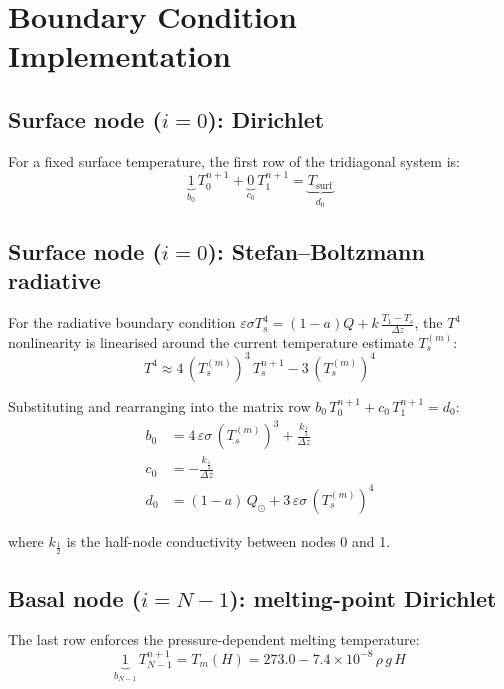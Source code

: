 \documentclass[11pt,a4paper]{article}
\newcommand{\half}{\tfrac{1}{2}}
\begin{document}
\section{Boundary Condition Implementation}
\label{sec:bc_impl}

\subsection{Surface node ($i = 0$): Dirichlet}

For a fixed surface temperature, the first row of the tridiagonal
system is:
\begin{equation}
\underbrace{1}_{b_0}\,T_0^{n+1} + \underbrace{0}_{c_0}\,T_1^{n+1}
= \underbrace{T_{\mathrm{surf}}}_{d_0}
\end{equation}

\subsection{Surface node ($i = 0$): Stefan--Boltzmann radiative}

For the radiative boundary condition
$\varepsilon\sigma T_s^4 = (1-a)Q + k\,\frac{T_1 - T_s}{\Delta z}$,
the $T^4$ nonlinearity is linearised around the current temperature
estimate $T_s^{(m)}$:
\begin{equation}
T^4 \approx 4\,(T_s^{(m)})^3\,T_s^{n+1} - 3\,(T_s^{(m)})^4
\end{equation}

Substituting and rearranging into the matrix row
$b_0\,T_0^{n+1} + c_0\,T_1^{n+1} = d_0$:
\begin{align}
b_0 &= 4\,\varepsilon\sigma\,(T_s^{(m)})^3 + \frac{k_{\half}}{\Delta z}
  \label{eq:b0_rad} \\
c_0 &= -\frac{k_{\half}}{\Delta z} \label{eq:c0_rad} \\
d_0 &= (1-a)\,Q_{\odot} + 3\,\varepsilon\sigma\,(T_s^{(m)})^4
  \label{eq:d0_rad}
\end{align}

where $k_{\half}$ is the half-node conductivity between nodes 0 and 1.

\subsection{Basal node ($i = N{-}1$): melting-point Dirichlet}

The last row enforces the pressure-dependent melting temperature:
\begin{equation}
\underbrace{1}_{b_{N-1}}\,T_{N-1}^{n+1} = T_m(H)
  = 273.0 - 7.4\times10^{-8}\,\rho\,g\,H
\end{equation}
\end{document}
